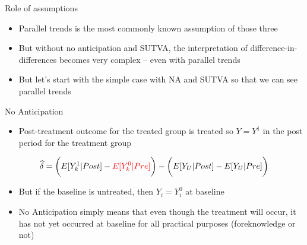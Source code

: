 \documentclass{beamer}
\begin{document}
\begin{frame}{Role of assumptions}

\begin{itemize}
\item Parallel trends is the most commonly known assumption of those three
\item But without no anticipation and SUTVA, the interpretation of difference-in-differences becomes very complex -- even with parallel trends
\item But let's start with the simple case with NA and SUTVA so that we can see parallel trends

\end{itemize}

\end{frame}



\begin{frame}{No Anticipation}

\begin{itemize}
\item Post-treatment outcome for the treated group is treated so $Y=Y^1$ in the post period for the treatment group
\end{itemize}

\begin{eqnarray*}
\widehat{\delta} = \bigg ( E[Y^1_k|Post] - \textcolor{red}{E[Y^0_k|Pre]} \bigg ) - \bigg ( E[Y_U | Post ] - E[ Y_U | Pre] \bigg) \\
\end{eqnarray*}

\begin{itemize}
\item But if the baseline is untreated, then $Y_i=Y^0_i$ at baseline
\item No Anticipation simply means that even though the treatment will occur, it has not yet occurred at baseline for all practical purposes (foreknowledge or not)
\end{itemize}


\end{frame}
\end{document}
